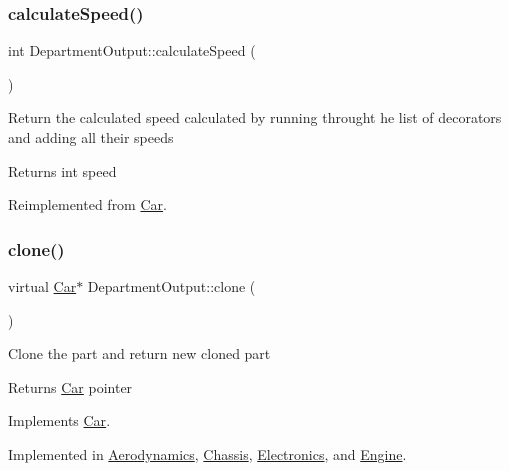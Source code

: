 \mbox{\label{classDepartmentOutput_a34d5c432ee7e7e8a33a4e8099a2c751f}} 
\subsubsection{\texorpdfstring{calculate\+Speed()}{calculateSpeed()}}
{\footnotesize\ttfamily int Department\+Output\+::calculate\+Speed (\begin{DoxyParamCaption}{ }\end{DoxyParamCaption})\hspace{0.3cm}{\ttfamily [virtual]}}

Return the calculated speed calculated by running throught he list of decorators and adding all their speeds \begin{DoxyReturn}{Returns}
int speed 
\end{DoxyReturn}


Reimplemented from \hyperlink{classCar_aadb72568edbdf571547ec48e9781237f}{Car}.

\mbox{\label{classDepartmentOutput_ab20c9d559bca6ce8e6748dfac47c3f84}} 
\subsubsection{\texorpdfstring{clone()}{clone()}}
{\footnotesize\ttfamily virtual \hyperlink{classCar}{Car}$\ast$ Department\+Output\+::clone (\begin{DoxyParamCaption}{ }\end{DoxyParamCaption})\hspace{0.3cm}{\ttfamily [pure virtual]}}

Clone the part and return new cloned part \begin{DoxyReturn}{Returns}
\hyperlink{classCar}{Car} pointer 
\end{DoxyReturn}


Implements \hyperlink{classCar_a5a54bbfe8e72022f4d9fdf6ecc990d99}{Car}.



Implemented in \hyperlink{classAerodynamics_abbd7bb0e8186e3d86b8baf7a72aeb63e}{Aerodynamics}, \hyperlink{classChassis_a2700ee5437760643c7cad46e077dcbcd}{Chassis}, \hyperlink{classElectronics_a292164aedff12771f4f05af648a9fc70}{Electronics}, and \hyperlink{classEngine_a18a3b9d950e67a868420b79890ba1428}{Engine}.

